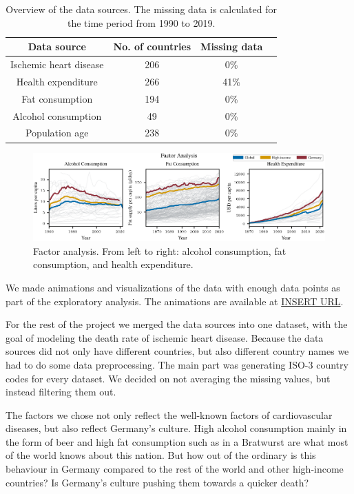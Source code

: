 \begin{table}[h]
    \centering
    \caption{Overview of the data sources. The missing data is calculated for the time period from 1990 to 2019.}
    \label{Data overview}
    \begin{tabular}{|c|c|c|c|}
    \hline
    Data source & No. of countries & Missing data\\
    \hline
    Ischemic heart disease & 206 & 0\%\\
    Health expenditure & 266 & 41\%\\
    Fat consumption & 194 & 0\%\\
    Alcohol consumption & 49 & 0\%\\
    Population age & 238 & 0\%\\
    \hline
    \end{tabular}
\end{table}

\begin{figure}[ht]
    \vskip 0.2in
    \centering
    \centerline{\includegraphics[]{fig/fig_factor_analysis.pdf}}
    \caption{Factor analysis. From left to right: alcohol consumption, fat consumption, and health expenditure. }
    \label{Factor analysis}
\end{figure}

We made animations and visualizations of the data with enough data points as part of the exploratory analysis. The animations are available at \url{INSERT URL}. 

For the rest of the project we merged the data sources into one dataset, with the goal of modeling the death rate of ischemic heart disease. Because the data sources did not only have different countries, but also different country names we had to do some data preprocessing. The main part was generating ISO-3 country codes for every dataset. 
We decided on not averaging the missing values, but instead filtering them out.

The factors we chose not only reflect the well-known factors of cardiovascular diseases, but also reflect Germany's culture. High alcohol consumption mainly in the form of beer and high fat consumption such as in a Bratwurst are what most of the world knows about this nation. But how out of the ordinary is this behaviour in Germany compared to the rest of the world and other high-income countries? Is Germany's culture pushing them towards a quicker death?

